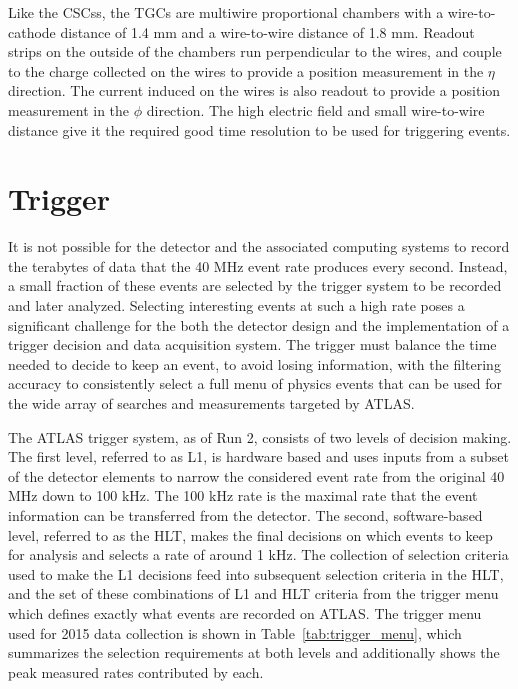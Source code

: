 Like the \acp{CSC}s, the \acp{TGC} are multiwire proportional chambers with a wire-to-cathode distance of 1.4 mm and a wire-to-wire distance of 1.8 mm.
Readout strips on the outside of the chambers run perpendicular to the wires, and couple to the charge collected on the wires to provide a position measurement in the $\eta$ direction.
The current induced on the wires is also readout to provide a position measurement in the $\phi$ direction.
The high electric field and small wire-to-wire distance give it the required good time resolution to be used for triggering events. 


\section{Trigger}
\label{sec:trigger}

It is not possible for the detector and the associated computing systems to record the terabytes of data that the 40 MHz event rate produces every second.
Instead, a small fraction of these events are selected by the trigger system to be recorded and later analyzed.
Selecting interesting events at such a high rate poses a significant challenge for the both the detector design and the implementation of a trigger decision and data acquisition system.
The trigger must balance the time needed to decide to keep an event, to avoid losing information, with the filtering accuracy to consistently select a full menu of physics events that can be used for the wide array of searches and measurements targeted by ATLAS. 

The ATLAS trigger system, as of Run 2, consists of two levels of decision making. 
The first level, referred to as L1, is hardware based and uses inputs from a subset of the detector elements to narrow the considered event rate from the original 40 MHz down to 100 kHz.
The 100 kHz rate is the maximal rate that the event information can be transferred from the detector.
The second, software-based level, referred to as the \ac{HLT}, makes the final decisions on which events to keep for analysis and selects a rate of around 1 kHz.
The collection of selection criteria used to make the L1 decisions feed into subsequent selection criteria in the \ac{HLT}, and the set of these combinations of L1 and \ac{HLT} criteria from the trigger menu which defines exactly what events are recorded on ATLAS.
The trigger menu used for 2015 data collection is shown in Table~\ref{tab:trigger_menu}, which summarizes the selection requirements at both levels and additionally shows the peak measured rates contributed by each.

